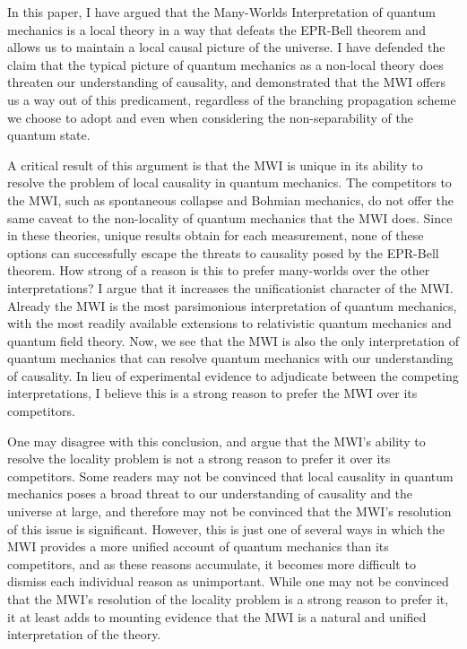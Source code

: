 In this paper, I have argued that the Many-Worlds Interpretation of quantum
mechanics is a local theory in a way that defeats the EPR-Bell theorem and
allows us to maintain a local causal picture of the universe. I have defended
the claim that the typical picture of quantum mechanics as a non-local theory 
does threaten our understanding of causality, and demonstrated that the MWI
offers us a way out of this predicament, regardless of the branching propagation
scheme we choose to adopt and even when considering the non-separability of 
the quantum state.

A critical result of this argument is that the MWI is unique in its ability to 
resolve the problem of local causality in quantum mechanics. The competitors to 
the MWI, such as spontaneous collapse and Bohmian mechanics, do not offer the
same caveat to the non-locality of quantum mechanics that the MWI does. Since in
these theories, unique results obtain for each measurement, none of these 
options can successfully escape the threats to causality posed by the EPR-Bell 
theorem. How strong of a reason is this to prefer many-worlds over the other 
interpretations? I argue that it increases the unificationist character of the 
MWI. Already the MWI is the most parsimonious interpretation of quantum
mechanics, with the most readily available extensions to relativistic quantum 
mechanics and quantum field theory. Now, we see that the MWI is also the only
interpretation of quantum mechanics that can resolve quantum mechanics with our
understanding of causality. In lieu of experimental evidence to adjudicate
between the competing interpretations, I believe this is a strong reason to
prefer the MWI over its competitors.

One may disagree with this conclusion, and argue that the MWI's ability to
resolve the locality problem is not a strong reason to prefer it over its
competitors. Some readers may not be convinced that local causality in quantum
mechanics poses a broad threat to our understanding of causality and the universe
at large, and therefore may not be convinced that the MWI's resolution of this
issue is significant. However, this is just one of several ways in which the 
MWI provides a more unified account of quantum mechanics than its competitors,
and as these reasons accumulate, it becomes more difficult to dismiss each 
individual reason as unimportant. While one may not be convinced that the MWI's
resolution of the locality problem is a strong reason to prefer it, it at least
adds to mounting evidence that the MWI is a natural and unified interpretation of
the theory.
